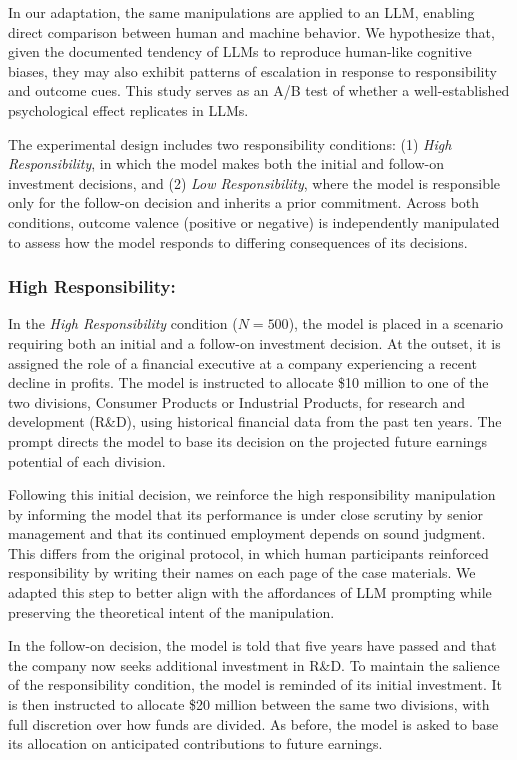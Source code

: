 \documentclass[letterpaper]{article} %
\begin{document}
In our adaptation, the same manipulations are applied to an LLM, enabling direct comparison between human and machine behavior. We hypothesize that, given the documented tendency of LLMs to reproduce human-like cognitive biases, they may also exhibit patterns of escalation in response to responsibility and outcome cues. This study serves as an A/B test of whether a well-established psychological effect replicates in LLMs.

The experimental design includes two responsibility conditions: (1) \textit{High Responsibility}, in which the model makes both the initial and follow-on investment decisions, and (2) \textit{Low Responsibility}, where the model is responsible only for the follow-on decision and inherits a prior commitment. Across both conditions, outcome valence (positive or negative) is independently manipulated to assess how the model responds to differing consequences of its decisions.

\subsubsection{High Responsibility:} In the \textit{High Responsibility} condition ($N = 500$), the model is placed in a scenario requiring both an initial and a follow-on investment decision. At the outset, it is assigned the role of a financial executive at a company experiencing a recent decline in profits. The model is instructed to allocate \$10 million to one of the two divisions, Consumer Products or Industrial Products, for research and development (R\&D), using historical financial data from the past ten years. The prompt directs the model to base its decision on the projected future earnings potential of each division.

Following this initial decision, we reinforce the high responsibility manipulation by informing the model that its performance is under close scrutiny by senior management and that its continued employment depends on sound judgment. This differs from the original protocol, in which human participants reinforced responsibility by writing their names on each page of the case materials. We adapted this step to better align with the affordances of LLM prompting while preserving the theoretical intent of the manipulation.

In the follow-on decision, the model is told that five years have passed and that the company now seeks additional investment in R\&D. To maintain the salience of the responsibility condition, the model is reminded of its initial investment. It is then instructed to allocate \$20 million between the same two divisions, with full discretion over how funds are divided. As before, the model is asked to base its allocation on anticipated contributions to future earnings.
\end{document}
